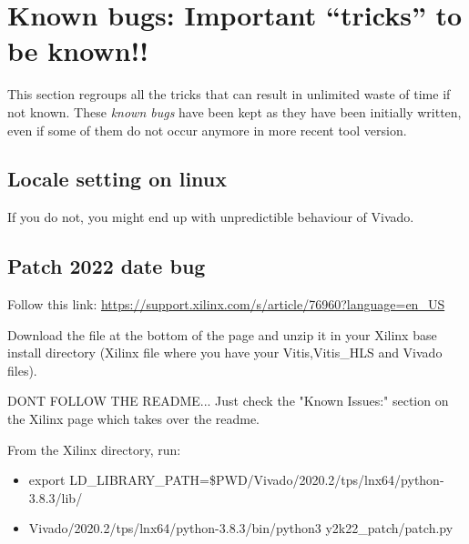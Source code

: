 \section{Known bugs: Important ``tricks'' to be known!!}
\label{bug}

This section regroups all the tricks that can result in unlimited waste of time if not known. These {\em known bugs} have been kept as they have been initially written, even if some of them do not occur anymore in more recent tool version.

\subsection{Locale setting on linux}
\label{localSetting}

If you do not, you might end up with unpredictible behaviour of Vivado.

\subsection{Patch 2022 date bug}
\label{2k22patch}

Follow this link: \url{https://support.xilinx.com/s/article/76960?language=en_US}

Download the file at the bottom of the page and unzip it in your Xilinx base install directory (Xilinx file where you have your Vitis,Vitis\_HLS and Vivado files). 

DONT FOLLOW THE README... Just check the "Known Issues:" section on the Xilinx page which takes over the readme.

From the Xilinx directory, run:
\begin{itemize}
\item export LD\_LIBRARY\_PATH=\$PWD/Vivado/2020.2/tps/lnx64/python-3.8.3/lib/
\item Vivado/2020.2/tps/lnx64/python-3.8.3/bin/python3 y2k22\_patch/patch.py
\end{itemize}

